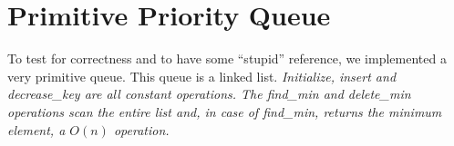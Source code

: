 \section*{Primitive Priority Queue}
To test for correctness and to have some ``stupid'' reference, we implemented a very primitive queue. This queue is a linked list. \em{Initialize}, \em{insert} and \em{decrease_key} are all constant operations. The \em{find_min} and \em{delete_min} operations scan the entire list and, in case of \em{find_min}, returns the minimum element, a $O(n)$ operation.